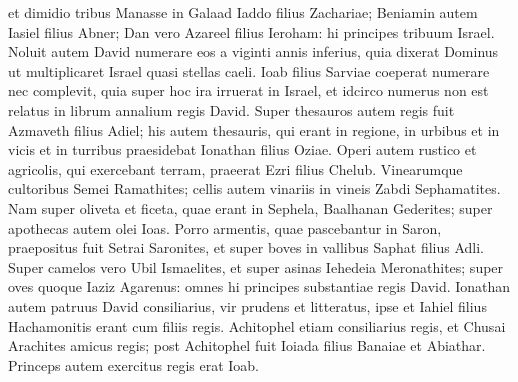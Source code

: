 \begin{biblechapter}
\begin{biblechapter}
\begin{biblechapter}
\begin{biblechapter}
\begin{biblechapter}
\begin{biblechapter}
\begin{biblechapter}
\begin{biblechapter}
\begin{biblechapter}
\begin{biblechapter}
\begin{biblechapter}
\begin{biblechapter}
\begin{biblechapter}
\begin{biblechapter}
\begin{biblechapter}
\begin{biblechapter}
\begin{biblechapter}
\begin{biblechapter}
\begin{biblechapter}
\begin{biblechapter}
\begin{biblechapter}
\begin{biblechapter}
\begin{biblechapter}
\begin{biblechapter}
\begin{biblechapter}
\begin{biblechapter}
\begin{biblechapter}
 \verse et dimidio tribus Manasse in Galaad Iaddo filius Zachariae; Beniamin autem Iasiel filius Abner; 
\verse Dan vero Azareel filius Ieroham: hi principes tribuum Israel. 
\verse Noluit autem David numerare eos a viginti annis inferius, quia dixerat Dominus ut multiplicaret Israel quasi stellas caeli. 
\verse Ioab filius Sarviae coeperat numerare nec complevit, quia super hoc ira irruerat in Israel, et idcirco numerus non est relatus in librum annalium regis David.
 \verse Super thesauros autem regis fuit Azmaveth filius Adiel; his autem thesauris, qui erant in regione, in urbibus et in vicis et in turribus praesidebat Ionathan filius Oziae. 
\verse Operi autem rustico et agricolis, qui exercebant terram, praeerat Ezri filius Chelub. 
\verse Vinearumque cultoribus Semei Ramathites; cellis autem vinariis in vineis Zabdi Sephamatites. 
\verse Nam super oliveta et ficeta, quae erant in Sephela, Baalhanan Gederites; super apothecas autem olei Ioas. 
\verse Porro armentis, quae pascebantur in Saron, praepositus fuit Setrai Saronites, et super boves in vallibus Saphat filius Adli. 
\verse Super camelos vero Ubil Ismaelites, et super asinas Iehedeia Meronathites; 
\verse super oves quoque Iaziz Agarenus: omnes hi principes substantiae regis David.
 \verse Ionathan autem patruus David consiliarius, vir prudens et litteratus, ipse et Iahiel filius Hachamonitis erant cum filiis regis. 
\verse Achitophel etiam consiliarius regis, et Chusai Arachites amicus regis; 
\verse post Achitophel fuit Ioiada filius Banaiae et Abiathar. Princeps autem exercitus regis erat Ioab.
 

\end{biblechapter}
\end{biblechapter}
\end{biblechapter}
\end{biblechapter}
\end{biblechapter}
\end{biblechapter}
\end{biblechapter}
\end{biblechapter}
\end{biblechapter}
\end{biblechapter}
\end{biblechapter}
\end{biblechapter}
\end{biblechapter}
\end{biblechapter}
\end{biblechapter}
\end{biblechapter}
\end{biblechapter}
\end{biblechapter}
\end{biblechapter}
\end{biblechapter}
\end{biblechapter}
\end{biblechapter}
\end{biblechapter}
\end{biblechapter}
\end{biblechapter}
\end{biblechapter}
\end{biblechapter}
